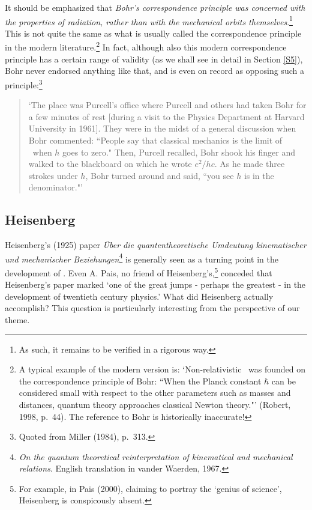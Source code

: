 \documentclass[12pt,titlepage]{article}
\begin{document}
It should be emphasized that {\it Bohr's correspondence principle was concerned with the properties of radiation, rather than with the mechanical orbits themselves}.\footnote{As such, it remains to be verified in a rigorous way.}
This  is not quite  the same as what is usually called the correspondence principle in the modern literature.\footnote{A typical example of the modern version is:  `Non-relativistic \qm\ was founded on the correspondence principle of Bohr: ``When the Planck constant $\hbar$ can be considered small with respect to the other parameters such as masses and distances, quantum theory approaches classical Newton theory."'  (Robert, 1998, p.\ 44). The reference to Bohr is historically inaccurate!} In fact, although also this modern correspondence principle has a certain range of validity (as we shall see in detail in Section \ref{S5}), Bohr never endorsed anything like that, and is even on record as opposing such a principle:\footnote{Quoted from Miller (1984), p.\ 313.}
\begin{quote}
`The place was Purcell's office where Purcell and others had taken Bohr for a few minutes of rest [during a visit to the Physics Department at Harvard University in 1961]. They were in the midst of a general discussion when Bohr commented: ``People say that classical mechanics is the limit of \qm\ when $h$ goes to zero." Then, Purcell recalled, Bohr shook his finger and walked to the blackboard on which he wrote $e^2/hc$. As he made three strokes under $h$, Bohr turned around and said, ``you see $h$ is in the denominator."'  
\end{quote} 
\subsection{Heisenberg}\label{heis}
Heisenberg's (1925) paper \textit{\"{U}ber die quantentheoretische Umdeutung kinematischer und mechanischer Beziehungen}\footnote{\textit{On the quantum theoretical reinterpretation of kinematical and mechanical relations}.  English translation in  vander Waerden, 1967.} is generally seen as a turning point in the development of \qm. Even A. Pais, no friend of Heisenberg's,\footnote{For example, in Pais (2000), claiming to portray the `genius of science', Heisenberg is conspicously absent.}  conceded that  Heisenberg's paper marked `one of the great jumps - perhaps the greatest - in the development of twentieth century physics.' What did Heisenberg actually accomplish? This question is particularly interesting from the perspective of our theme.
\end{document}
